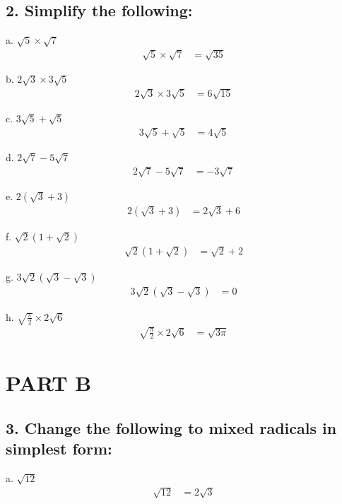 \documentclass{article}
\begin{document}
\subsection*{2. Simplify the following:}

a. $\sqrt{5} \times \sqrt{7}$
\begin{align*}
    \sqrt{5} \times \sqrt{7} &= \sqrt{35}
\end{align*}

b. $2 \sqrt{3} \times 3 \sqrt{5}$
\begin{align*}
    2 \sqrt{3} \times 3 \sqrt{5} &= 6 \sqrt{15}
\end{align*}

c. $3 \sqrt{5}+\sqrt{5}$
\begin{align*}
    3 \sqrt{5}+\sqrt{5} &= 4 \sqrt{5}
\end{align*}

d. $2 \sqrt{7}-5 \sqrt{7}$
\begin{align*}
    2 \sqrt{7}-5 \sqrt{7} &= -3 \sqrt{7}
\end{align*}

e. $2(\sqrt{3}+3)$
\begin{align*}
    2(\sqrt{3}+3) &= 2\sqrt{3}+6
\end{align*}

f. $\sqrt{2}(1 + \sqrt{2})$
\begin{align*}
    \sqrt{2}(1 + \sqrt{2}) &= \sqrt{2} + 2
\end{align*}

g. $3 \sqrt{2}(\sqrt{3}-\sqrt{3})$
\begin{align*}
    3 \sqrt{2}(\sqrt{3}-\sqrt{3}) &= 0
\end{align*}

h. $\sqrt{\frac{\pi}{2}} \times 2 \sqrt{6}$
\begin{align*}
    \sqrt{\frac{\pi}{2}} \times 2 \sqrt{6} &= \sqrt{3\pi}
\end{align*}

\section*{PART B}

\subsection*{3. Change the following to mixed radicals in simplest form:}

a. $\sqrt{12}$
\begin{align*}
    \sqrt{12} &= 2\sqrt{3}
\end{align*}
\end{document}
